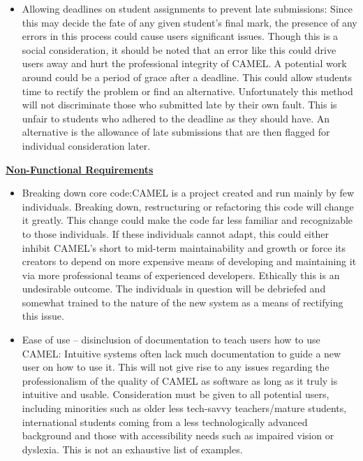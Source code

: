 \begin{itemize}
		\item Allowing deadlines on student assignments to prevent late submissions: Since this may decide the fate of any given student’s final mark, the presence of any errors in this process could cause users significant issues.
			Though this is a social consideration, it should be noted that an error like this could drive users away and hurt the professional integrity of CAMEL.
			A potential work around could be a period of grace after a deadline. This could allow students time to rectify the problem or find an alternative. Unfortunately this method will not discriminate those who submitted late by their own fault. This is unfair to students who adhered to the deadline as they should have.
			An alternative is the allowance of late submissions that are then flagged for individual consideration later.
	\end{itemize}

	\underline{\textbf{Non-Functional Requirements}}
	\begin{itemize}
		\item Breaking down core code:CAMEL is a project created and run mainly by few individuals. Breaking down, restructuring or refactoring this code will change it greatly. This change could make the code far less familiar and recognizable to those individuals.
			If these individuals cannot adapt, this could either inhibit CAMEL’s short to mid-term maintainability and growth or force its creators to depend on more expensive means of developing and maintaining it via more professional teams of experienced developers. Ethically this is an undesirable outcome.
			The individuals in question will be debriefed and somewhat trained to the nature of the new system as a means of rectifying this issue.

		\item Ease of use – disinclusion of documentation to teach users how to use CAMEL: Intuitive systems often lack much documentation to guide a new user on how to use it.
			This will not give rise to any issues regarding the professionalism of the quality of CAMEL as software as long as it truly is intuitive and usable. Consideration must be given to all potential users, including minorities such as older less tech-savvy teachers/mature students, international students coming from a less technologically advanced background and those with accessibility needs such as impaired vision or dyslexia. This is not an exhaustive list of examples.
	\end{itemize}
